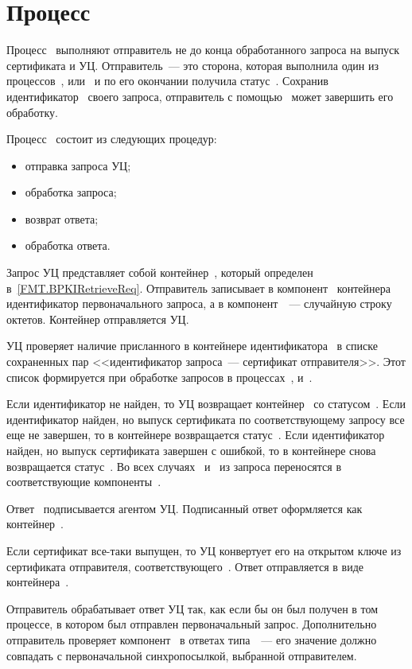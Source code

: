 \section{Процесс }\label{PROCESSES.Retrieve}

Процесс~ выполняют отправитель не до конца обработанного запроса
на выпуск сертификата и УЦ.  Отправитель~--- это сторона, которая выполнила один
из процессов~,  или~ и по его окончании
получила статус~. Сохранив идентификатор~ своего
запроса, отправитель с помощью~ может завершить его обработку.

Процесс~ состоит из следующих процедур:
\begin{itemize}
\item
отправка запроса УЦ;
\item
обработка запроса;
\item
возврат ответа;
\item
обработка ответа.
\end{itemize}

Запрос УЦ представляет собой контейнер~, который определен
в~\ref{FMT.BPKIRetrieveReq}. Отправитель записывает в компонент~
контейнера идентификатор первоначального запроса, а в компонент~~---
случайную строку октетов. Контейнер отправляется УЦ.

УЦ проверяет наличие присланного в контейнере идентификатора~ в
списке сохраненных пар <<идентификатор запроса~--- сертификат отправителя>>.
Этот список формируется при обработке запросов в процессах~,
 и~.

Если идентификатор не найден, то УЦ возвращает контейнер~ со
статусом~.
%
Если идентификатор найден, но выпуск сертификата по соответствующему запросу все
еще не завершен, то в контейнере возвращается статус~.
%
Если идентификатор найден, но выпуск сертификата завершен с ошибкой, то в
контейнере снова возвращается статус~.
%
Во всех случаях~ и~ из запроса переносятся в
соответствующие компоненты~.

Ответ~ подписывается агентом УЦ. Подписанный ответ оформляется
как контейнер~.

Если сертификат все-таки выпущен, то УЦ конвертует его на открытом ключе из
сертификата отправителя, соответствующего~. Ответ отправляется в
виде контейнера~.

Отправитель обрабатывает ответ УЦ так, как если бы он был получен в том
процессе, в котором был отправлен первоначальный запрос. Дополнительно
отправитель проверяет компонент~ в ответах типа~~---
его значение должно совпадать с первоначальной синхропосылкой, выбранной
отправителем.

